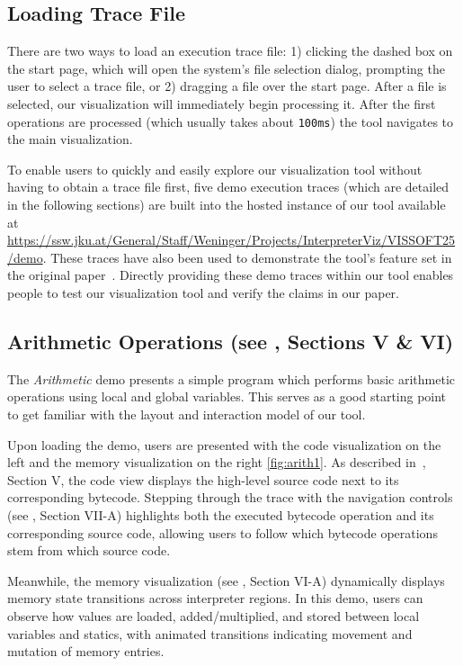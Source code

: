 \documentclass[conference]{IEEEtran}
\begin{document}
\subsection{Loading Trace File}


There are two ways to load an execution trace file: 1) clicking the dashed box on the start page, which will open the system's file selection dialog, prompting the user to select a trace file, or 2) dragging a file over the start page. 
After a file is selected, our visualization will immediately begin processing it. 
After the first operations are processed (which usually takes about \texttt{100ms}) the tool navigates to the main visualization.

To enable users to quickly and easily explore our visualization tool without having to obtain a trace file first, five demo execution traces (which are detailed in the following sections) are built into the hosted instance of our tool available at \url{https://ssw.jku.at/General/Staff/Weninger/Projects/InterpreterViz/VISSOFT25/demo}.
These traces have also been used to demonstrate the tool's feature set in the original paper~\cite{herber2025}.
Directly providing these demo traces within our tool enables people to test our visualization tool and verify the claims in our paper.

\subsection{Arithmetic Operations (see \cite{herber2025}, Sections V \& VI)}

The \emph{Arithmetic} demo presents a simple program which performs basic arithmetic operations using local and global variables. This serves as a good starting point to get familiar with the layout and interaction model of our tool.

Upon loading the demo, users are presented with the code visualization on the left and the memory visualization on the right \autoref{fig:arith1}. As described in~\cite{herber2025}, Section V, the code view displays the high-level source code next to its corresponding bytecode. Stepping through the trace with the navigation controls (see \cite{herber2025}, Section VII-A) highlights both the executed bytecode operation and its corresponding source code, allowing users to follow which bytecode operations stem from which source code.

Meanwhile, the memory visualization (see \cite{herber2025}, Section VI-A) dynamically displays memory state transitions across interpreter regions. In this demo, users can observe how values are loaded, added/multiplied, and stored between local variables and statics, with animated transitions indicating movement and mutation of memory entries.
\end{document}
